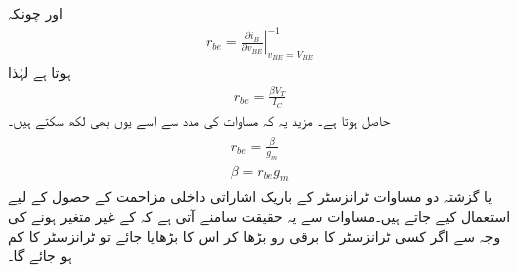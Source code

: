 اور چونکہ
\begin{align*}
r_{be}=\left. \frac{\partial i_B}{\partial v_{BE}} \right |_{v_{BE}=V_{BE}}^{-1}
\end{align*}
ہوتا ہے لہٰذا
\begin{align} \label{مساوات_ٹرانزسٹر_داخلی_مزاحمت_بالمقابل_رو}
r_{be}=\frac{\beta V_T}{I_C}
\end{align}
حاصل ہوتا ہے۔ مزید یہ کہ مساوات   کی مدد سے اسے یوں بھی لکھ سکتے ہیں۔
\begin{gather} \label{مساوات_ٹرانزسٹر_داخلی_مزاحمت_بالمقابل_موصلیت_نما}
\begin{aligned} 
r_{be}=\frac{\beta}{g_m} \\
\beta=r_{be} g_m
\end{aligned}
\end{gather}
یا
گزشتہ دو مساوات ٹرانزسٹر کے باریک اشاراتی داخلی مزاحمت  کے حصول کے لیے استعمال کیے جاتے ہیں۔مساوات   سے یہ حقیقت سامنے آتی ہے  کہ    کے غیر متغیر ہونے کی وجہ سے اگر کسی ٹرانزسٹر کا برقی رو   بڑھا کر اس کا  بڑھایا جائے تو ٹرانزسٹر کا  کم ہو جائے گا۔

